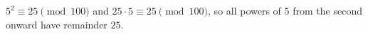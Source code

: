 $5^2\equiv25\pmod{100}$ and $25\cdot5\equiv25\pmod{100}$, so all powers of $5$ from the second onward have remainder $\boxed{25}$.
